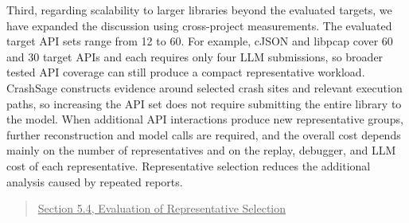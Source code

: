 \documentclass[onecolumn,11pt]{article}
\newcommand{\nc}[2]{\needspace{5\baselineskip}\begin{quote}\underline{#1}\\ \nopagebreak[4]{\leavevmode\color{blue}{``#2"}}\end{quote}}
\begin{document}
Third, regarding scalability to larger libraries beyond the evaluated targets, we have expanded the discussion using cross-project measurements. The evaluated target API sets range from 12 to 60. For example, cJSON and libpcap cover 60 and 30 target APIs and each requires only four LLM submissions, so broader tested API coverage can still produce a compact representative workload. CrashSage constructs evidence around selected crash sites and relevant execution paths, so increasing the API set does not require submitting the entire library to the model. When additional API interactions produce new representative groups, further reconstruction and model calls are required, and the overall cost depends mainly on the number of representatives and on the replay, debugger, and LLM cost of each representative. Representative selection reduces the additional analysis caused by repeated reports.

\nc{Section 5.4, Evaluation of Representative Selection}{The mean end-to-end latency across the 96 representatives is 28.69 s, covering context reconstruction, evidence packaging and prompt construction, and LLM analysis. Context and prompt times come from the timing measurements, while LLM latency comes from the archived responses for the same representatives. Because the context measurements were collected serially, the 96 representatives require approximately 45.9 minutes of processing in total, which is the sum of the per-representative mean over the evaluated representatives. This figure is an estimate of accumulated analysis time rather than a measured wall-clock time of one end-to-end run, because the context measurements and the archived LLM responses were collected separately and are combined through the per-representative mean.}
\end{document}
